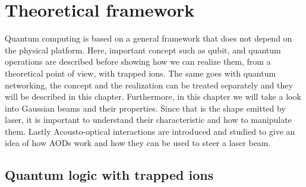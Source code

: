 
\chapter{Theoretical framework}
Quantum computing is based on a general framework that does not depend on the physical platform. Here, important concept such as qubit, and quantum operations are described before showing how we can realize them, from a theoretical point of view, with trapped ions. The same goes with quantum networking, the concept and the realization can be treated separately and they will be described in this chapter. Furthermore, in this chapter we will take a look into Gaussian beams and their properties. Since that is the shape emitted by laser, it is important to understand their characteristic and how to manipulate them. Lastly Acousto-optical interactions are introduced and studied to give an idea of how AODs work and how they can be used to steer a laser beam.
\section{Quantum logic with trapped ions}
